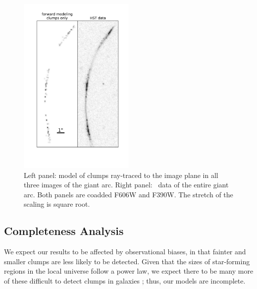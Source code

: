 \begin{figure}
\centering
\includegraphics[width=0.5\textwidth,trim={1cm 2.5cm 0.6cm 1cm},clip]{Chap4/c4f11.pdf}
\caption[Ray-traced model of \giantarc\ in the image plane]{Left panel: model of clumps ray-traced to the image plane in all three images of the giant arc. Right panel: \hst\ data of the entire giant arc. Both panels are coadded F606W and F390W. The stretch of the scaling is square root.}
\label{chap4:fig:full_arc_model}
\end{figure}

\subsection{Completeness Analysis}
We expect our results to be affected by observational biases, in that fainter and smaller clumps are less likely to be detected. Given that the sizes of star-forming regions in the local universe follow a power law, we expect there to be many more of these difficult to detect clumps in galaxies \citep{Kennicutt:1989fk}; thus, our models are incomplete.

